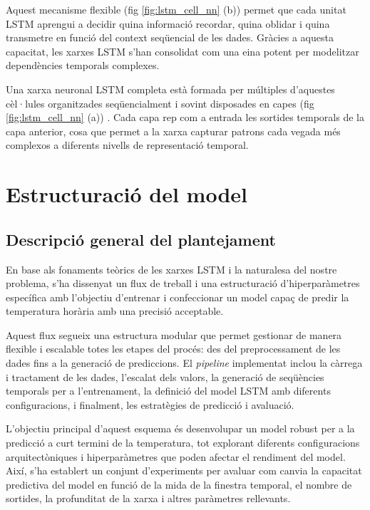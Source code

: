 \documentclass[../main.tex]{subfiles}
\begin{document}
Aquest mecanisme flexible (fig \cref{fig:lstm_cell_nn} (b)) permet que cada unitat LSTM aprengui a decidir quina informació recordar, quina oblidar i quina transmetre en funció del context seqüencial de les dades. Gràcies a aquesta capacitat, les xarxes LSTM s’han consolidat com una eina potent per modelitzar dependències temporals complexes.

Una xarxa neuronal LSTM completa està formada per múltiples d’aquestes cèl·lules organitzades seqüencialment i sovint disposades en capes (fig \cref{fig:lstm_cell_nn} (a)) . Cada capa rep com a entrada les sortides temporals de la capa anterior, cosa que permet a la xarxa capturar patrons cada vegada més complexos a diferents nivells de representació temporal.


\section{Estructuració del model}

\subsection{Descripció general del plantejament}

En base als fonaments teòrics de les xarxes LSTM i la naturalesa del nostre problema, s'ha dissenyat un flux de treball i una estructuració d'hiperparàmetres específica amb l'objectiu d'entrenar i confeccionar un model capaç de predir la temperatura horària amb una precisió acceptable.

Aquest flux segueix una estructura modular que permet gestionar de manera flexible i escalable totes les etapes del procés: des del preprocessament de les dades fins a la generació de prediccions. El \textit{pipeline} implementat inclou la càrrega i tractament de les dades, l’escalat dels valors, la generació de seqüències temporals per a l’entrenament, la definició del model LSTM amb diferents configuracions, i finalment, les estratègies de predicció i avaluació.

L’objectiu principal d’aquest esquema és desenvolupar un model robust per a la predicció a curt termini de la temperatura, tot explorant diferents configuracions arquitectòniques i hiperparàmetres que poden afectar el rendiment del model. Així, s’ha establert un conjunt d’experiments per avaluar com canvia la capacitat predictiva del model en funció de la mida de la finestra temporal, el nombre de sortides, la profunditat de la xarxa i altres paràmetres rellevants.
\end{document}
